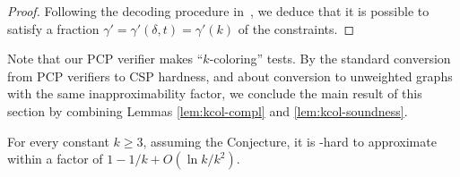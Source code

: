 \begin{proof}
    Following the decoding procedure in~\cite{KKMO}, we deduce that it
    is possible to satisfy a fraction $\gamma' = \gamma'(\delta,t) =
    \gamma'(k)$
    of the constraints.
\end{proof}

%
Note that our PCP verifier makes ``$k$-coloring'' tests. By the
standard conversion from PCP verifiers to CSP hardness, and
 about conversion to unweighted graphs with
the same inapproximability factor, we conclude the main result of this
section by combining Lemmas \ref{lem:kcol-compl} and
\ref{lem:kcol-soundness}.
\begin{theorem}
  For every constant $k \ge 3$, assuming the  Conjecture, it
  is -hard to approximate  within a factor of
  $1-1/k+O(\ln k/k^2)$.
\end{theorem}

